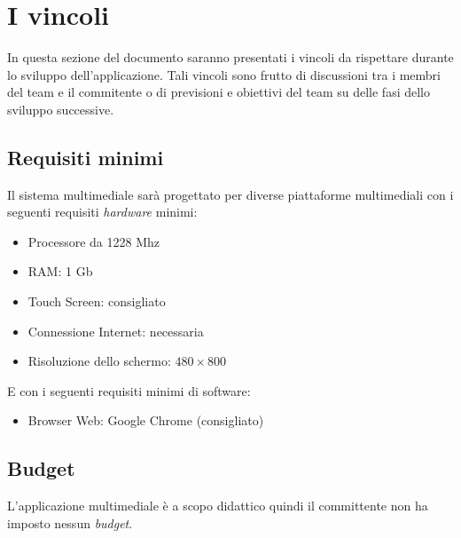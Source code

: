\section{I vincoli}
In questa sezione del documento saranno presentati i vincoli da rispettare durante lo sviluppo dell'applicazione. Tali vincoli sono frutto di discussioni tra i membri del team e il commitente o di previsioni e obiettivi del team su delle fasi dello sviluppo successive.

\subsection{Requisiti minimi}
Il sistema multimediale sarà progettato per diverse piattaforme multimediali con i seguenti requisiti \emph{hardware} minimi:
\begin{itemize}
	\item Processore da 1228 Mhz
	\item RAM: 1 Gb
	\item Touch Screen: consigliato 
	\item Connessione Internet: necessaria
	\item Risoluzione dello schermo: $480 \times 800$
\end{itemize}
E con i seguenti requisiti minimi di software:
\begin{itemize}
	\item Browser Web: Google Chrome (consigliato)
\end{itemize}

\subsection{Budget}
L'applicazione multimediale è a scopo didattico quindi il committente non ha imposto nessun \emph{budget}.